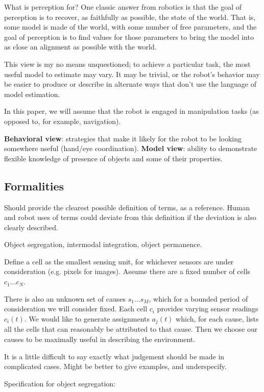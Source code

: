 What is perception for?  One classic answer from robotics is that the
goal of perception is to recover, as faithfully as possible, the state
of the world.  That is, some model is made of the world, with some
number of free parameters, and the goal of perception is to find
values for those parameters to bring the model into as close an
alignment as possible with the world.

This view is my no means unquestioned; to achieve a particular
task, the most useful model to estimate may vary.  It may be
trivial, or the robot's behavior may be easier to produce or
describe in alternate ways that don't use the language of
model estimation.

In this paper, we will assume that the robot is engaged
in manipulation tasks (as opposed to, for example, navigation).

{\bf Behavioral view}: strategies that make it likely for the robot
to be looking somewhere useful (hand/eye coordination).
{\bf Model view}: ability to demonstrate flexible knowledge of presence of 
objects and some of their properties.


\subsection{Formalities}

Should provide the clearest possible definition of terms,
as a reference.  Human and robot uses of terms could deviate
from this definition if the deviation is also clearly described.

Object segregation, intermodal integration, object permanence.

Define a cell as the smallest sensing unit, for whichever sensors are
under consideration (e.g. pixels for images).  Assume there are a
fixed number of cells $c_1...c_{N}$.

There is also an unknown set of causes $s_1...s_{M}$, which for a
bounded period of consideration we will consider fixed.  Each cell
$c_i$ provides varying sensor readings $c_i(t)$.  We would like to
generate assignments $a_j(t)$ which, for each cause, lists all the
cells that can reasonably be attributed to that cause.  Then we choose
our causes to be maximally useful in describing the environment.

It is a little difficult to say exactly what judgement should be
made in complicated cases.  Might be better to give examples,
and underspecify.

Specification for object segregation:

